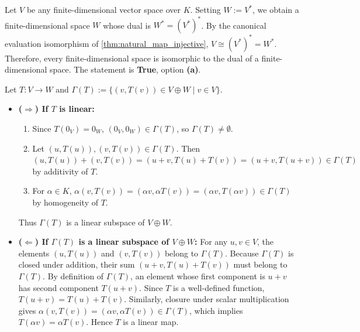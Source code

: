 \begin{exercisesolution*}
\label{sol:every_finite_dim_is_dual_sc}
Let $V$ be any finite-dimensional vector space over $K$.
Setting $W := V^*$, we obtain a finite-dimensional space $W$ whose dual is $W^* = (V^*)^*$.
By the canonical evaluation isomorphism of \cref{thm:natural_map_injective}, $V \cong (V^*)^* = W^*$.
Therefore, every finite-dimensional space is isomorphic to the dual of a finite-dimensional space.
The statement is \textbf{True}, option \textbf{(a)}.
\end{exercisesolution*}


\begin{exercisesolution}
\label{sol:graph_of_linear_map}
Let $T \colon V \to W$ and $\Gamma(T) := \{(v, T(v)) \in V \oplus W \mid v \in V\}$.

\begin{itemize}
    \item \textbf{($\Rightarrow$) If $T$ is linear:}
    \begin{enumerate}
        \item Since $T(0_V) = 0_W$, $(0_V, 0_W) \in \Gamma(T)$, so $\Gamma(T) \ne \emptyset$.
        \item Let $(u, T(u)), (v, T(v)) \in \Gamma(T)$. Then $(u, T(u)) + (v, T(v)) = (u+v, T(u)+T(v)) = (u+v, T(u+v)) \in \Gamma(T)$ by additivity of $T$.
        \item For $\alpha \in K$, $\alpha(v, T(v)) = (\alpha v, \alpha T(v)) = (\alpha v, T(\alpha v)) \in \Gamma(T)$ by homogeneity of $T$.
    \end{enumerate}
    Thus $\Gamma(T)$ is a linear subspace of $V \oplus W$.

    \item \textbf{($\Leftarrow$) If $\Gamma(T)$ is a linear subspace of $V \oplus W$:}
    For any $u, v \in V$, the elements $(u, T(u))$ and $(v, T(v))$ belong to $\Gamma(T)$.
    Because $\Gamma(T)$ is closed under addition, their sum $(u+v, T(u)+T(v))$ must belong to $\Gamma(T)$.
    By definition of $\Gamma(T)$, an element whose first component is $u+v$ has second component $T(u+v)$.
    Since $T$ is a well-defined function, $T(u+v) = T(u) + T(v)$.
    Similarly, closure under scalar multiplication gives $\alpha(v, T(v)) = (\alpha v, \alpha T(v)) \in \Gamma(T)$, which implies $T(\alpha v) = \alpha T(v)$.
    Hence $T$ is a linear map.
\end{itemize}
\end{exercisesolution}

